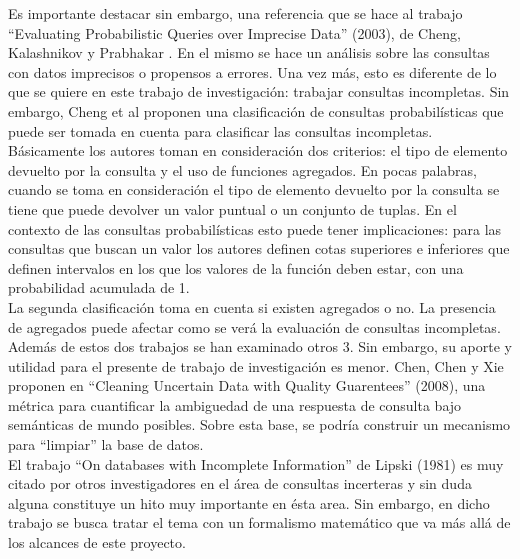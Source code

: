 Es importante destacar sin embargo, una referencia que se hace al trabajo “Evaluating Probabilistic Queries over Imprecise Data” (2003), de Cheng, Kalashnikov y Prabhakar \cite{evaluatingProbabilisticQueriesOverImpreciseData}. En el mismo se hace un análisis sobre las consultas con datos imprecisos o propensos a errores. Una vez más, esto es diferente de lo que se quiere en este trabajo de investigación: trabajar consultas incompletas. Sin embargo, Cheng et al proponen una clasificación de consultas probabilísticas que puede ser tomada en cuenta para clasificar las consultas incompletas. \\

Básicamente los autores toman en consideración dos criterios: el tipo de elemento devuelto por la consulta y el uso de funciones agregados. En pocas palabras, cuando se toma en consideración el tipo de elemento devuelto por la consulta se tiene que puede devolver un valor puntual o un conjunto de tuplas. En el contexto de las consultas probabilísticas esto puede tener implicaciones: para las consultas que buscan un valor los autores definen cotas superiores e inferiores que definen intervalos en los que los valores de la función deben estar, con una probabilidad acumulada de 1.  \\

La segunda clasificación toma en cuenta si existen agregados o no. La presencia de agregados puede afectar como se verá la evaluación de consultas incompletas. \\

Además de estos dos trabajos se han examinado otros 3. Sin embargo, su aporte y utilidad  para el presente de trabajo de investigación es menor. Chen, Chen y Xie proponen en “Cleaning Uncertain Data with Quality Guarentees” (2008)\cite{cleaningUncertainDataWithQualityGuarantees}, una métrica para cuantificar la ambiguedad de una respuesta de consulta bajo semánticas de mundo posibles. Sobre esta base, se podría construir un mecanismo para “limpiar” la base de datos. \\

El trabajo “On databases with Incomplete Information” de Lipski (1981)\cite{onDatabasesWithIncompleteInformation} es muy citado por otros investigadores en el área de consultas incerteras y sin duda alguna constituye un hito muy importante en ésta area. Sin embargo, en dicho trabajo se busca tratar el tema con un formalismo matemático que va más allá de los alcances de este proyecto. \\

